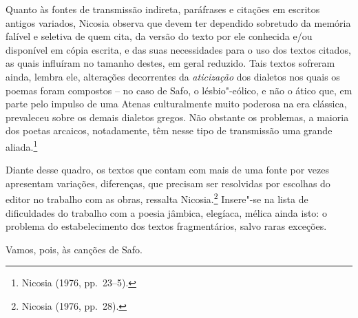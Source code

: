 Quanto às fontes de transmissão indireta, paráfrases e citações em escritos
antigos variados, Nicosia observa que devem ter dependido
sobretudo da memória falível e seletiva de quem cita, da versão do texto por
ele conhecida e/ou disponível em cópia escrita, e das suas necessidades para o
uso dos textos citados, as quais influíram no tamanho destes, em geral
reduzido. Tais textos sofreram ainda, lembra ele, alterações decorrentes da
\textit{aticização} dos dialetos nos quais os poemas foram compostos -- no caso de Safo,
o lésbio"-eólico, e não o ático que, em parte pelo impulso de uma Atenas
culturalmente muito poderosa na era clássica, prevaleceu sobre os demais
dialetos gregos. Não obstante os problemas, a maioria dos poetas
arcaicos, notadamente, têm nesse tipo de transmissão uma grande aliada.\footnote{ Nicosia (1976, pp.~23--5).}

Diante desse quadro, os textos que contam com mais de uma fonte por vezes
apresentam variações, diferenças, que precisam ser resolvidas por escolhas do
editor no trabalho com as obras, ressalta Nicosia.\footnote{ Nicosia (1976, pp.~28).} Insere"-se na lista
de dificuldades do trabalho com a poesia jâmbica, elegíaca, mélica
ainda isto: o problema do estabelecimento dos textos fragmentários, salvo raras
exceções. 

Vamos, pois, às canções de Safo.

